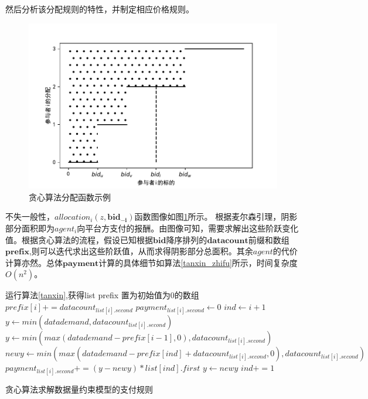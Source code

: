 \documentclass[promaster]{thesis-uestc}
\begin{document}
然后分析该分配规则的特性，并制定相应价格规则。

\begin{figure}[H]
    \includegraphics[width=350pt]{pic/tanxin_allocation.pdf}
    \caption{贪心算法分配函数示例}
    \label{tanxin_allocation}
\end{figure}

不失一般性，$allocation_i(z,\mathbf{bid_{-i}})$函数图像如图\ref{tanxin_allocation}所示。
根据麦尔森引理，阴影部分面积即为$agent_i$向平台方支付的报酬。由图像可知，需要求解出这些阶跃变化值。根据贪心算法的流程，假设已知根据$\mathbf{bid}$降序排列的$\mathbf{datacount}$前缀和数组$\mathbf{prefix}$,则可以迭代求出这些阶跃值，从而求得阴影部分总面积。其余$agent$的代价计算亦然。总体$\mathbf{payment}$计算的具体细节如算法\ref{tanxin_zhifu}所示，时间复杂度$O(n^2)$。

\begin{algorithm}[h]
    运行算法\ref{tanxin},获得list\;
    prefix 置为初始值为0的数组\;
    {
        $prefix[i]  += datacount_{list[i].second}$\;
    }
    {
        $payment_{list[i].second} \leftarrow 0$\;
        $ind \leftarrow i + 1$
        {
            $y \leftarrow min(datademand,datacount_{list[i].second})$\;
        }{
        $y \leftarrow min(max(datademand - prefix[i-1],0),datacount_{list[i].second})$\;
        }
        {
            $newy \leftarrow min(max(datademand - prefix[ind]+ datacount_{list[i].second},0),datacount_{list[i].second})$\;
            $payment_{list[i].second} += (y - newy)*list[ind].first$\;
            $y \leftarrow newy$\;
            $ind += 1$\;
        }
    }
\caption{贪心算法求解数据量约束模型的支付规则}
\label{tanxin_zhifu}
\end{algorithm}
\end{document}
